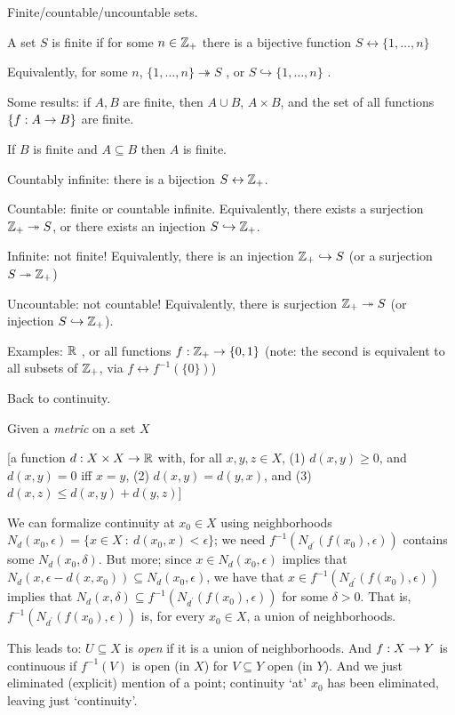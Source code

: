 \documentclass[12pt]{article}
\begin{document}
\msk

Finite/countable/uncountable sets.

A set $S$ is finite if for some $n\in{\mathbb Z}_+$ there is a 
bijective function $S\leftrightarrow \{1,\ldots,n\}$

Equivalently, for some $n$, $\{1,\ldots,n\}\twoheadrightarrow S$ , 
or $S\hookrightarrow\{1,\ldots,n\}$ .

Some results: if $A,B$ are finite, then $A\cup B$, $A\times B$, and the
set of all functions $\{f:A\rightarrow B\}$ are finite.

If $B$ is finite and $A\subseteq B$ then $A$ is finite.

Countably infinite: there is a bijection $S\leftrightarrow {\mathbb Z}_+$. 

Countable: finite or countable infinite. Equivalently, there exists a
surjection ${\mathbb Z}_+\twoheadrightarrow S$, or there exists an injection
$S\hookrightarrow {\mathbb Z}_+$.

Infinite: not finite! Equivalently, there is an injection ${\mathbb Z}_+\hookrightarrow S$
(or a surjection $S\twoheadrightarrow{\mathbb Z}_+$)

Uncountable: not countable! Equivalently, there is 
surjection ${\mathbb Z}_+\twoheadrightarrow S$ (or 
injection $S\hookrightarrow {\mathbb Z}_+$).

Examples: ${\mathbb R}$ , or all functions $f:{\mathbb Z}_+\rightarrow\{0,1\}$ (note: the second
is equivalent to all subsets of ${\mathbb Z}_+$, via $f\leftrightarrow f^{-1}(\{0\})$)

\msk

Back to continuity.

Given a {\it metric} on a set $X$ 

[a function $d:X\times X\rightarrow {\mathbb R}$ with,
for all $x,y,z\in X$,
(1) $d(x,y)\geq 0$, and $d(x,y) = 0$ iff $x=y$, (2) $d(x,y)=d(y,x)$, and (3)
$d(x,z)\leq d(x,y)+d(y,z)$]

We can formalize continuity at $x_0\in X$ using neighborhoods $N_d(x_0,\epsilon) = 
\{x\in X\ :\ d(x_0,x)<\epsilon\}$; we need
$f^{-1}(N_{d^\prime}(f(x_0),\epsilon))$ contains some $N_d(x_0,\delta)$. But more;
since $x\in N_d(x_0,\epsilon)$ implies that 
$N_d(x,\epsilon-d(x,x_0))\subseteq N_d(x_0,\epsilon)$, we have that
$x\in f^{-1}(N_{d^\prime}(f(x_0),\epsilon))$ implies that 
$N_d(x,\delta)\subseteq f^{-1}(N_{d^\prime}(f(x_0),\epsilon))$ for some $\delta>0$.
That is, $f^{-1}(N_{d^\prime}(f(x_0),\epsilon))$ is, for every $x_0\in X$, a union of 
neighborhoods.

This leads to: $U\subseteq X$ is {\it open} if it is a union of neighborhoods. And
$f:X\rightarrow Y$ is continuous if $f^{-1}(V)$  is open (in $X$) for 
 $V\subseteq Y$ open (in $Y$). And we just eliminated (explicit)
mention of a point; continuity `at' $x_0$ has been eliminated, leaving just `continuity'.
\end{document}
